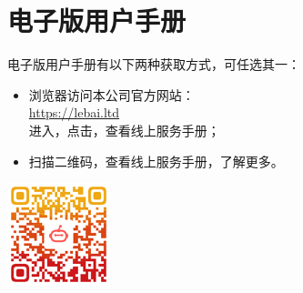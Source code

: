 \chapter*{电子版用户手册}

电子版用户手册有以下两种获取方式，可任选其一：

\vspace*{1em}

\begin{itemize}
    \item 浏览器访问本公司官方网站：\\\url{https://lebai.ltd}\\进入，点击，查看线上服务手册；

    \vspace*{1em}

    \item 扫描二维码，查看线上服务手册，了解更多。

\end{itemize}

\begin{center}
    \includegraphics[width=3cm]{image/qrcode.png}
\end{center}
